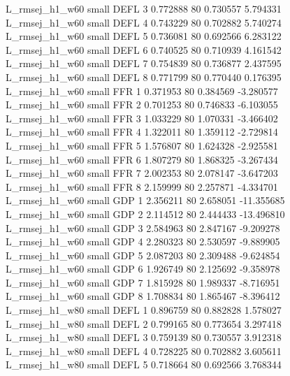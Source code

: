 L_rmsej_h1_w60      small     DEFL                 3 0.772888 80       0.730557           5.794331
L_rmsej_h1_w60      small     DEFL                 4 0.743229 80       0.702882           5.740274
L_rmsej_h1_w60      small     DEFL                 5 0.736081 80       0.692566           6.283122
L_rmsej_h1_w60      small     DEFL                 6 0.740525 80       0.710939           4.161542
L_rmsej_h1_w60      small     DEFL                 7 0.754839 80       0.736877           2.437595
L_rmsej_h1_w60      small     DEFL                 8 0.771799 80       0.770440           0.176395
L_rmsej_h1_w60      small      FFR                 1 0.371953 80       0.384569          -3.280577
L_rmsej_h1_w60      small      FFR                 2 0.701253 80       0.746833          -6.103055
L_rmsej_h1_w60      small      FFR                 3 1.033229 80       1.070331          -3.466402
L_rmsej_h1_w60      small      FFR                 4 1.322011 80       1.359112          -2.729814
L_rmsej_h1_w60      small      FFR                 5 1.576807 80       1.624328          -2.925581
L_rmsej_h1_w60      small      FFR                 6 1.807279 80       1.868325          -3.267434
L_rmsej_h1_w60      small      FFR                 7 2.002353 80       2.078147          -3.647203
L_rmsej_h1_w60      small      FFR                 8 2.159999 80       2.257871          -4.334701
L_rmsej_h1_w60      small      GDP                 1 2.356211 80       2.658051         -11.355685
L_rmsej_h1_w60      small      GDP                 2 2.114512 80       2.444433         -13.496810
L_rmsej_h1_w60      small      GDP                 3 2.584963 80       2.847167          -9.209278
L_rmsej_h1_w60      small      GDP                 4 2.280323 80       2.530597          -9.889905
L_rmsej_h1_w60      small      GDP                 5 2.087203 80       2.309488          -9.624854
L_rmsej_h1_w60      small      GDP                 6 1.926749 80       2.125692          -9.358978
L_rmsej_h1_w60      small      GDP                 7 1.815928 80       1.989337          -8.716951
L_rmsej_h1_w60      small      GDP                 8 1.708834 80       1.865467          -8.396412
L_rmsej_h1_w80      small     DEFL                 1 0.896759 80       0.882828           1.578027
L_rmsej_h1_w80      small     DEFL                 2 0.799165 80       0.773654           3.297418
L_rmsej_h1_w80      small     DEFL                 3 0.759139 80       0.730557           3.912318
L_rmsej_h1_w80      small     DEFL                 4 0.728225 80       0.702882           3.605611
L_rmsej_h1_w80      small     DEFL                 5 0.718664 80       0.692566           3.768344
